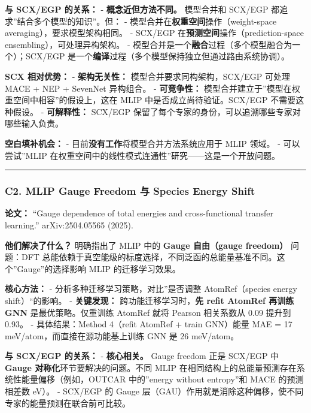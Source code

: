\documentclass[
  12pt,
]{ctexart}
\begin{document}
\textbf{与 SCX/EGP 的关系：} - \textbf{概念近但方法不同。} 模型合并和
SCX/EGP 都追求''结合多个模型的知识''。但： -
模型合并在\textbf{权重空间}操作（weight-space
averaging），要求模型架构相同。 - SCX/EGP
在\textbf{预测空间}操作（prediction-space ensembling），可处理异构架构。
- 模型合并是一个\textbf{融合}过程（多个模型融合为一个）；SCX/EGP
是一个\textbf{编译}过程（多个模型保持独立但通过路由系统协调）。

\textbf{SCX 相对优势：} - \textbf{架构无关性：}
模型合并要求同构架构，SCX/EGP 可处理 MACE + NEP + SevenNet 异构组合。 -
\textbf{可竞争性：} 模型合并建立于''模型在权重空间中相容''的假设上，这在
MLIP 中是否成立尚待验证。SCX/EGP 不需要这种假设。 - \textbf{可解释性：}
SCX/EGP 保留了每个专家的身份，可以追溯哪些专家对哪些输入负责。

\textbf{空白填补机会：} - 目前\textbf{没有工作}将模型合并方法系统应用于
MLIP 领域。 - 可以尝试''MLIP
在权重空间中的线性模式连通性''研究------这是一个开放问题。

\begin{center}\rule{0.5\linewidth}{0.5pt}\end{center}

\subsubsection{C2. MLIP Gauge Freedom 与 Species Energy
Shift}\label{c2.-mlip-gauge-freedom-ux4e0e-species-energy-shift}

\textbf{论文：} ``Gauge dependence of total energies and
cross-functional transfer learning.'' arXiv:2504.05565 (2025).

\textbf{他们解决了什么？} 明确指出了 MLIP 中的 \textbf{Gauge 自由（gauge
freedom）} 问题：DFT
总能依赖于真空能级的标度选择，不同泛函的总能量基准不同。这个''Gauge''的选择影响
MLIP 的迁移学习效果。

\textbf{核心方法：} - 分析多种迁移学习策略，对比''是否调整
AtomRef（species energy shift）``的影响。 - \textbf{关键发现：}
跨功能迁移学习时，\textbf{先 refit AtomRef 再训练 GNN}
是最优策略。仅重训练 AtomRef 就将 Pearson 相关系数从 0.09 提升到 0.93。
- 具体结果：Method 4（refit AtomRef + train GNN）能量 MAE = 17
meV/atom，而直接在源功能基上训练 GNN 是 26 meV/atom。

\textbf{与 SCX/EGP 的关系：} - \textbf{核心相关。} Gauge freedom 正是
SCX/EGP 中 \textbf{Gauge 对称化}环节要解决的问题。不同 MLIP
在相同结构上的总能量预测存在系统性能量偏移（例如，OUTCAR 中的''energy
without entropy''和 MACE 的预测相差数 eV）。 - SCX/EGP 的 Gauge
层（GAU）作用就是消除这种偏移，使不同专家的能量预测在联合前可比较。
\end{document}
